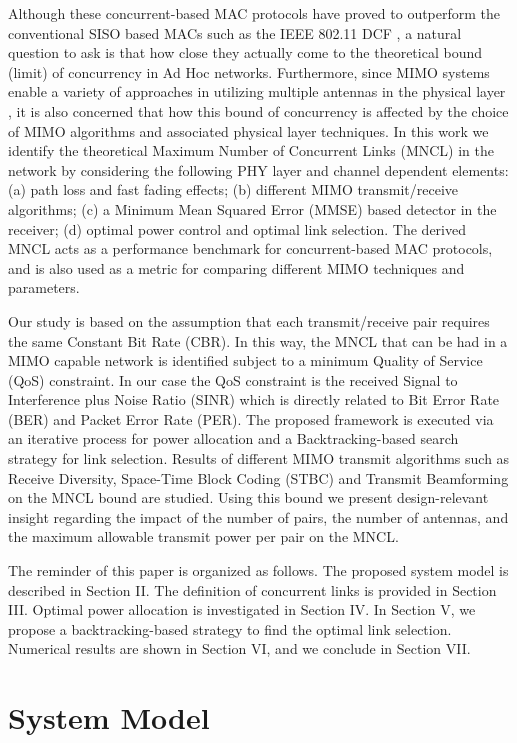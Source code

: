 \documentclass[draftcls,onecolumn,peerview,12pt]{IEEEtran}
\begin{document}
Although these concurrent-based MAC protocols have proved to
outperform the conventional SISO based MACs such as the IEEE 802.11
DCF \cite{7_MAC}, a natural question to ask is that how close they
actually come to the theoretical bound (limit) of concurrency in Ad
Hoc networks. Furthermore, since MIMO systems enable a variety of
approaches in utilizing multiple antennas in the physical layer
\cite{19_MIMO}, it is also concerned that how this bound of
concurrency is affected by the choice of MIMO algorithms and
associated physical layer techniques. In this work we identify the
theoretical Maximum Number of Concurrent Links (MNCL) in the network
by considering the following PHY layer and channel dependent
elements: (a) path loss and fast fading effects; (b) different MIMO
transmit/receive algorithms; (c) a Minimum Mean Squared Error (MMSE)
based detector in the receiver; (d) optimal power control and
optimal link selection. The derived MNCL acts as a performance
benchmark for concurrent-based MAC protocols, and is also used as a
metric for comparing different MIMO techniques and parameters.




Our study is based on the assumption that each transmit/receive pair
requires the same Constant Bit Rate (CBR). In this way, the MNCL
that can be had in a MIMO capable network is identified subject to a
minimum Quality of Service (QoS) constraint. In our case the QoS
constraint is the received Signal to Interference plus Noise Ratio
(SINR) which is directly related to Bit Error Rate (BER) and Packet
Error Rate (PER). The proposed framework is executed via an
iterative process for power allocation and a Backtracking-based
search strategy for link selection. Results of different MIMO
transmit algorithms such as Receive Diversity, Space-Time Block
Coding (STBC) and Transmit Beamforming on the MNCL bound are
studied. Using this bound we present design-relevant insight
regarding the impact of the number of pairs, the number of antennas,
and the maximum allowable transmit power per pair on the MNCL.

The reminder of this paper is organized as follows. The proposed
system model is described in Section II. The definition of
concurrent links is provided in Section III. Optimal power
allocation is investigated in Section IV. In Section V, we propose a
backtracking-based strategy to find the optimal link selection.
Numerical results are shown in Section VI, and we conclude in
Section VII.

\section{System Model}
\end{document}
